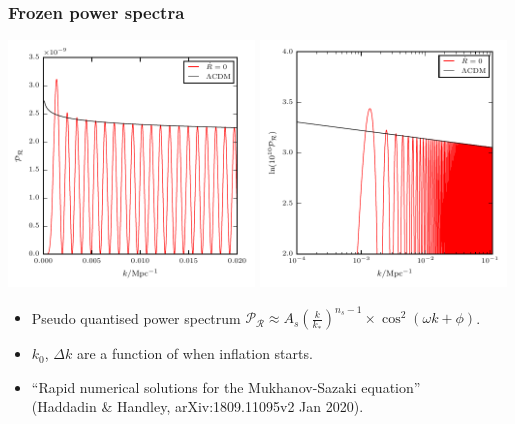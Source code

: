 \documentclass[%
]{beamer}
\begin{document}
\begin{frame}
    \frametitle{Frozen power spectra}
    \includegraphics[width=0.49\textwidth]{quantised_pps}
    \includegraphics[width=0.49\textwidth]{quantised_pps_log}
    \begin{itemize}
        \item Pseudo quantised power spectrum $\mathcal{P}_\mathcal{R}\approx A_s{\left( \frac{k}{k_*} \right)}^{n_s-1}\times \cos^2(\omega k+\phi)$.
        \item $k_0$, $\Delta k$ are a function of when inflation starts.
        \item ``Rapid numerical solutions for the Mukhanov-Sazaki equation''\\(Haddadin \& Handley, arXiv:1809.11095v2 Jan 2020).
    \end{itemize}

\end{frame}
\end{document}
